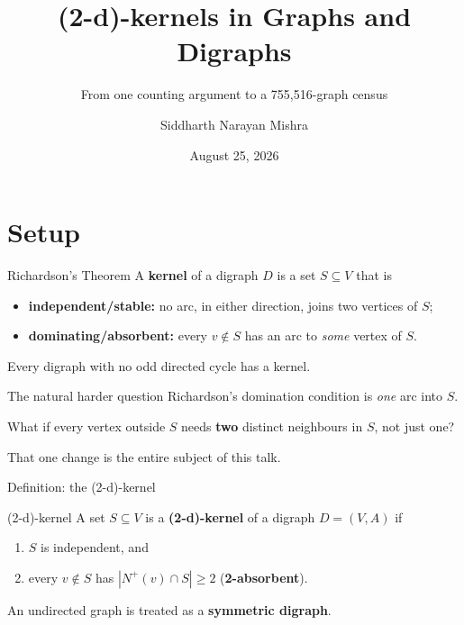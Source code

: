 \documentclass[11pt]{beamer}
\title{(2-d)-kernels in Graphs and Digraphs}
\subtitle{From one counting argument to a 755{,}516-graph census}
\author{Siddharth Narayan Mishra}
\date{August 25, 2026}
\begin{document}
\begin{frame}
  \titlepage
\end{frame}

\section{Setup}

\begin{frame}{Richardson's Theorem}
  A \textbf{kernel} of a digraph $D$ is a set $S \subseteq V$ that is
  \begin{itemize}
    \item \textbf{independent/stable:} no arc, in either direction, joins two vertices of $S$;
    \item \textbf{dominating/absorbent:} every $v \notin S$ has an arc to \emph{some} vertex of $S$.
  \end{itemize}

  \bigskip
  \begin{theorem}[Richardson, 1953]
    Every digraph with no odd directed cycle has a kernel.
  \end{theorem}

\end{frame}

\begin{frame}{The natural harder question}
  Richardson's domination condition is \emph{one} arc into $S$.

  \bigskip
  What if every vertex outside $S$ needs \textbf{two} distinct neighbours in $S$,
  not just one?

  \bigskip
  That one change is the entire subject of this talk.
\end{frame}

\begin{frame}{Definition: the (2-d)-kernel}
  \begin{block}{(2-d)-kernel}
    A set $S \subseteq V$ is a \textbf{(2-d)-kernel} of a digraph $D = (V,A)$ if
    \begin{enumerate}
      \item[(i)] $S$ is independent, and
      \item[(ii)] every $v \notin S$ has $|N^+(v) \cap S| \ge 2$ (\textbf{2-absorbent}).
    \end{enumerate}
  \end{block}

  \bigskip
  An undirected graph is treated as a \textbf{symmetric digraph}.
\end{frame}
\end{document}
